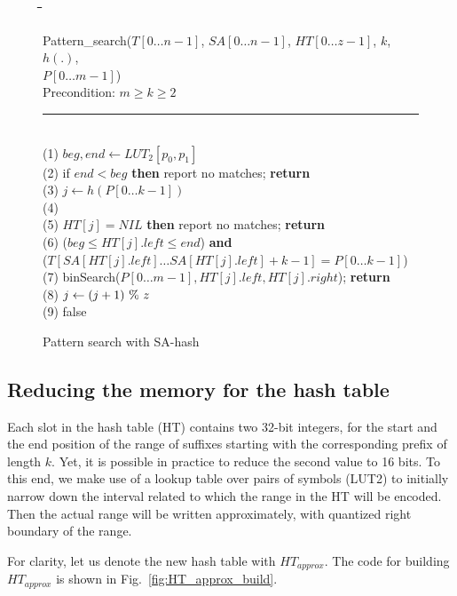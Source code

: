 \documentclass{cai}
\newcommand{\umod}{{\bf~\%~}\xspace}
\newcommand{\uassign}{\leftarrow}
\newcommand{\uif}{{\bf if}\xspace}
\newcommand{\uthen}{{\bf then}\xspace}
\newcommand{\urepeat}{{\bf repeat}\xspace}
\newcommand{\uuntil}{{\bf until}\xspace}
\newcommand{\ureturn}{{\bf return}\xspace}
\newcounter{lineno}
\newcommand{\utab}{\qquad}
\newcommand{\startindent}{\hspace{0.8em}}
\newenvironment{code}{\setcounter{lineno}{0}\begin{tabbing}
\utab\=\utab\=\utab\=\utab\=\utab\=\utab\=\utab\=\utab\=\utab\=\utab\=\utab\=\utab\=\utab\= \kill
}
{
\end{tabbing}\vspace{-2mm}
}
\begin{document}
\begin{figure}
\begin{small}
\begin{code}
Pattern\_search($T[0 \ldots n-1]$, $SA[0 \ldots n-1]$, $HT[0 \ldots z-1]$, $k$, $h(.)$, \\
\>\>\>$P[0 \ldots m-1]$) \\
Precondition: $m \geq k \geq 2$ \\
\rule{\textwidth}{0.3mm} \\
(1) \startindent $beg, end \uassign LUT_2[p_0,p_1]$ \\
(2) \startindent if $end < beg$ \uthen report no matches; \ureturn \\
(3) \startindent $j \uassign h(P[0 \ldots k-1])$ \\
(4) \startindent \urepeat \\
(5) \startindent \>\>\uif $HT[j] = NIL$ \uthen report no matches; \ureturn \\
(6) \startindent \>\>\uif ($beg \leq HT[j].left \leq end$) \textbf{and} \\
\>\>\>($T[SA[HT[j].left] \ldots SA[HT[j].left] + k - 1] = P[0 \ldots k-1]$) \\
(7) \startindent \>\>\>\uthen binSearch($P[0 \ldots m-1], HT[j].left, HT[j].right$); \ureturn \\
(8) \startindent \>\>$j \uassign (j + 1) \umod z$ \\
(9) \startindent \uuntil false \\
\end{code}
\caption{Pattern search with SA-hash}
\label{fig:Pattern_search}
\end{small}
\end{figure}


\subsection{Reducing the memory for the hash table}

Each slot in the hash table (HT) contains two 32-bit integers, 
for the start and the end position of the range of suffixes starting 
with the corresponding prefix of length $k$.
Yet, it is possible in practice to reduce the second value to 16 bits.
To this end, we make use of a lookup table over 
pairs of symbols (LUT2)
to initially narrow down the interval related to which the range in the HT 
will be encoded.
Then the actual range will be written approximately, with quantized
right boundary of the range.

For clarity, let us denote the new hash table with $HT_{approx}$. 
The code for building $HT_{approx}$ 
is shown in Fig.~\ref{fig:HT_approx_build}.
\end{document}
